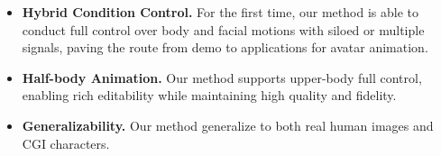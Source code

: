 \begin{itemize}
    \item \textbf{Hybrid Condition Control.} For the first time, our method is able to conduct full control over body and facial motions with siloed or multiple signals, paving the route from demo to applications for avatar animation.
    \item \textbf{Half-body Animation.} Our method supports upper-body full control, enabling rich editability while maintaining high quality and fidelity.
    \item \textbf{Generalizability.} Our method generalize to both real human images and CGI characters. 
\end{itemize}



